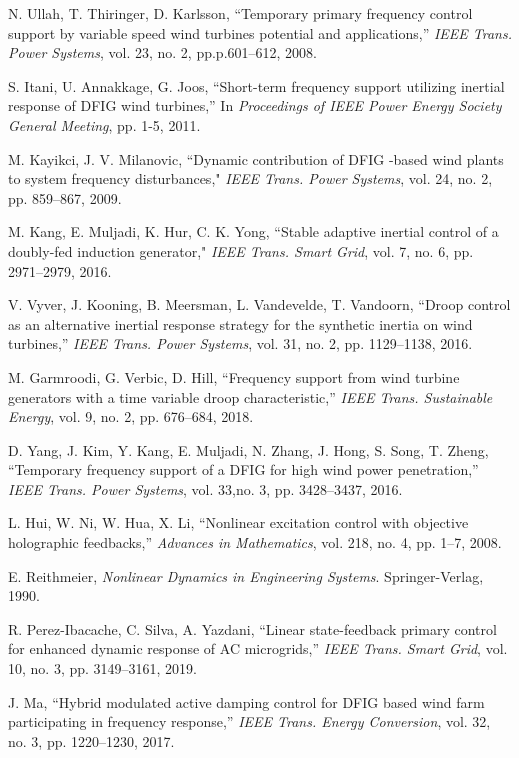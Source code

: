 \documentclass[journal]{IEEEtran}
\begin{document}
\begin{thebibliography}{99}
N. Ullah, T. Thiringer, D. Karlsson, ``Temporary primary  frequency control support by variable speed wind turbines potential and applications,” \emph{IEEE Trans. Power Systems}, vol. 23, no. 2, pp.p.601–612, 2008.

S. Itani, U. Annakkage, G. Joos, ``Short-term frequency support utilizing inertial response of DFIG wind turbines,” In \emph{Proceedings of IEEE Power Energy Society General Meeting}, pp. 1-5, 2011.

M.  Kayikci, J. V. Milanovic, ``Dynamic contribution of DFIG -based wind plants to system frequency disturbances," \emph{IEEE Trans. Power Systems}, vol. 24, no. 2, pp. 859–867, 2009.

M. Kang, E. Muljadi, K. Hur, C. K. Yong, ``Stable adaptive inertial control of a doubly-fed induction generator," \emph{IEEE Trans. Smart Grid}, vol. 7, no. 6, pp. 2971–2979, 2016.

V. Vyver,  J. Kooning, B. Meersman, L. Vandevelde, T. Vandoorn,  ``Droop control as an alternative inertial response strategy for the synthetic inertia on wind turbines,” \emph{IEEE Trans. Power Systems}, vol. 31, no. 2, pp. 1129–1138, 2016.

M. Garmroodi, G. Verbic, D. Hill, ``Frequency support from wind turbine generators with a time variable droop characteristic,” \emph{IEEE Trans. Sustainable Energy}, vol. 9, no. 2, pp. 676–684, 2018.

D. Yang, J. Kim, Y. Kang, E. Muljadi, N. Zhang, J. Hong, S. Song, T. Zheng, ``Temporary frequency support of a DFIG for high wind power penetration,” \emph{IEEE Trans. Power Systems}, vol. 33,no. 3, pp. 3428–3437, 2016.

L. Hui,  W. Ni,  W. Hua, X. Li, ``Nonlinear excitation control  with objective holographic feedbacks,” \emph{Advances in Mathematics}, vol. 218, no. 4, pp. 1–7, 2008.

E. Reithmeier, \emph{Nonlinear Dynamics in Engineering Systems}. Springer-Verlag, 1990.

R. Perez-Ibacache, C. Silva, A. Yazdani, ``Linear  state-feedback primary control for enhanced dynamic response of AC microgrids,” \emph{IEEE Trans. Smart Grid}, vol. 10, no. 3, pp. 3149–3161, 2019.

J. Ma, ``Hybrid modulated active damping control for DFIG based  wind farm participating in frequency response,” \emph{IEEE Trans. Energy Conversion}, vol. 32, no. 3, pp. 1220–1230, 2017.


\end{thebibliography}
\end{document}
